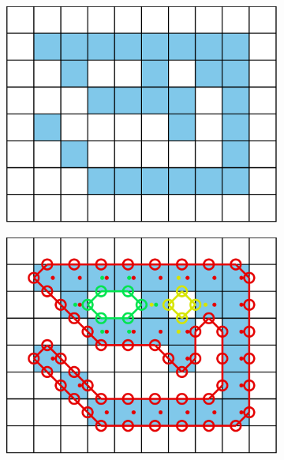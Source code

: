 \documentclass[9pt,lineno]{elife}
\newcommand{\TRex}{\protect\path{TRex}}
\begin{document}
\begin{figure}
    \centering
    \begin{subfigure}[b]{0.49\textwidth}
            \centering
           \includegraphics[width=\textwidth]{piece.pdf}
    \end{subfigure}
    \begin{subfigure}[b]{0.49\textwidth}
           \centering
           	\includegraphics[width=\textwidth]{outline_approximation.pdf}

\end{subfigure}
\end{figure}
\end{document}

